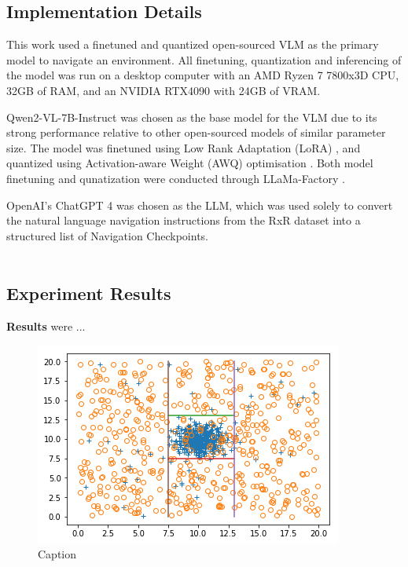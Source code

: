 \documentclass{svproc}
\begin{document}
\subsection{Implementation Details}
    This work used a finetuned and quantized open-sourced VLM as the primary model to navigate an environment. All finetuning, quantization and inferencing of the model was run on a desktop computer with an AMD Ryzen 7 7800x3D CPU, 32GB of RAM, and an NVIDIA RTX4090 with 24GB of VRAM.

    Qwen2-VL-7B-Instruct \cite{Qwen-VL, Qwen2VL} was chosen as the base model for the VLM due to its strong performance relative to other open-sourced models \cite{vlm_leaderboard, Nguyen-Mau_2024_ACCV} of similar parameter size.
    The model was finetuned using Low Rank Adaptation (LoRA) \cite{LoRA}, and quantized using Activation-aware Weight (AWQ) optimisation \cite{MLSYS2024_42a452cb}. Both model finetuning and qunatization were conducted through LLaMa-Factory \cite{zheng2024llamafactory}.

    OpenAI's ChatGPT 4 \cite{openai2024gpt4technicalreport} was chosen as the LLM, which was used solely to convert the natural language navigation instructions from the RxR dataset into a structured list of Navigation Checkpoints.
    \\ \\


\subsection{Experiment Results}
    \textbf{Results} were ...

    \begin{figure}
        \centering
        \includegraphics[scale=.75]{figures/DecisionBoundary.png}
        \caption{Caption}
        \label{fig:fig2}
    \end{figure}
\end{document}
